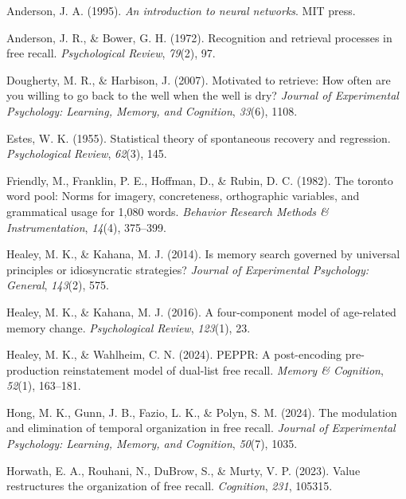 \documentclass[
  man,
  floatsintext,
  longtable,
  nolmodern,
  notxfonts,
  notimes,
  draftfirst,
  colorlinks=true,linkcolor=blue,citecolor=blue,urlcolor=blue]{apa7}
\newlength{\cslhangindent}
\newenvironment{CSLReferences}[2] %
 {\begin{list}{}{%
  \setlength{\itemindent}{0pt}
  \setlength{\leftmargin}{0pt}
  \setlength{\parsep}{0pt}
  \ifodd #1
   \setlength{\leftmargin}{\cslhangindent}
   \setlength{\itemindent}{-1\cslhangindent}
  \fi
  \setlength{\itemsep}{#2\baselineskip}}}
 {\end{list}}
\begin{document}
\label{refs}
\begin{CSLReferences}{1}{0}
Anderson, J. A. (1995). \emph{An introduction to neural networks}. MIT
press.

Anderson, J. R., \& Bower, G. H. (1972). Recognition and retrieval
processes in free recall. \emph{Psychological Review}, \emph{79}(2), 97.

Dougherty, M. R., \& Harbison, J. (2007). Motivated to retrieve: How
often are you willing to go back to the well when the well is dry?
\emph{Journal of Experimental Psychology: Learning, Memory, and
Cognition}, \emph{33}(6), 1108.

Estes, W. K. (1955). Statistical theory of spontaneous recovery and
regression. \emph{Psychological Review}, \emph{62}(3), 145.

Friendly, M., Franklin, P. E., Hoffman, D., \& Rubin, D. C. (1982). The
toronto word pool: Norms for imagery, concreteness, orthographic
variables, and grammatical usage for 1,080 words. \emph{Behavior
Research Methods \& Instrumentation}, \emph{14}(4), 375--399.

Healey, M. K., \& Kahana, M. J. (2014). Is memory search governed by
universal principles or idiosyncratic strategies? \emph{Journal of
Experimental Psychology: General}, \emph{143}(2), 575.

Healey, M. K., \& Kahana, M. J. (2016). A four-component model of
age-related memory change. \emph{Psychological Review}, \emph{123}(1),
23.

Healey, M. K., \& Wahlheim, C. N. (2024). PEPPR: A post-encoding
pre-production reinstatement model of dual-list free recall.
\emph{Memory \& Cognition}, \emph{52}(1), 163--181.

Hong, M. K., Gunn, J. B., Fazio, L. K., \& Polyn, S. M. (2024). The
modulation and elimination of temporal organization in free recall.
\emph{Journal of Experimental Psychology: Learning, Memory, and
Cognition}, \emph{50}(7), 1035.

Horwath, E. A., Rouhani, N., DuBrow, S., \& Murty, V. P. (2023). Value
restructures the organization of free recall. \emph{Cognition},
\emph{231}, 105315.


\end{CSLReferences}
\end{document}
